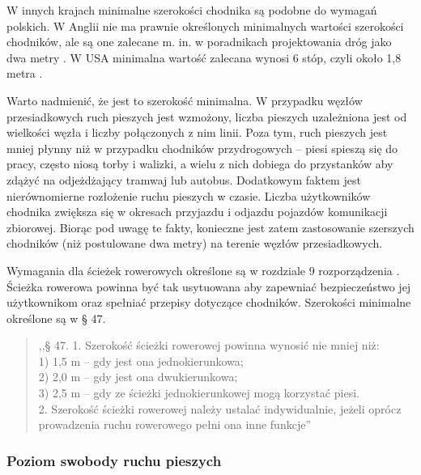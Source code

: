 \documentclass[twoside,12pt]{article}
\begin{document}
	 W innych krajach minimalne szerokości chodnika są podobne do wymagań polskich. W Anglii nie ma prawnie określonych minimalnych wartości szerokości chodników, ale są one zalecane m. in. w poradnikach projektowania dróg jako dwa metry \cite{young}. W USA minimalna wartość zalecana wynosi 6 stóp, czyli około 1,8 metra \cite{guidelines_washington}. 
	 
	 Warto nadmienić, że jest to szerokość minimalna. W przypadku węzłów przesiadkowych ruch pieszych jest wzmożony, liczba pieszych uzależniona jest od wielkości węzła i liczby połączonych z nim linii. Poza tym, ruch pieszych jest mniej płynny niż w przypadku chodników przydrogowych -- piesi spieszą się do pracy, często niosą torby i walizki, a wielu z nich dobiega do przystanków aby zdążyć na odjeżdżający tramwaj lub autobus. Dodatkowym faktem jest nierównomierne rozłożenie ruchu pieszych w czasie. Liczba użytkowników chodnika zwiększa się w okresach przyjazdu i odjazdu pojazdów komunikacji zbiorowej. Biorąc pod uwagę te fakty, konieczne jest zatem zastosowanie szerszych chodników (niż postulowane dwa metry) na terenie węzłów przesiadkowych. 
	 
	 Wymagania dla ścieżek rowerowych określone są w rozdziale 9 rozporządzenia \cite{rozporzadzenie_drogi}. Ścieżka rowerowa powinna być tak usytuowana aby zapewniać bezpieczeństwo jej użytkownikom oraz spełniać przepisy dotyczące chodników. Szerokości minimalne określone są w § 47.
	 \begin{quote}
	  ,,§ 47. 1. Szerokość ścieżki rowerowej powinna wynosić nie mniej niż:\\
1) 1,5 m – gdy jest ona jednokierunkowa;\\
2) 2,0 m – gdy jest ona dwukierunkowa;\\
3) 2,5 m – gdy ze ścieżki jednokierunkowej mogą korzystać piesi.\\
2. Szerokość ścieżki rowerowej należy ustalać indywidualnie, jeżeli oprócz prowadzenia ruchu rowerowego pełni ona
inne funkcje'' \cite{rozporzadzenie_drogi}
	 \end{quote}
	 
	 \subsubsection{Poziom swobody ruchu pieszych}
	 
\end{document}
